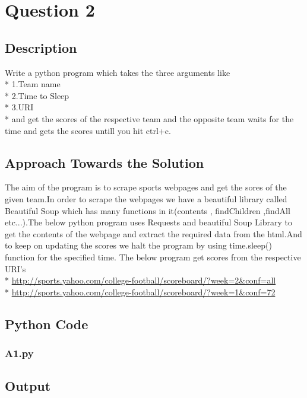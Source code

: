 \documentclass[12pt]{article}
\begin{document}
\section{Question 2}
\subsection{Description}
Write a python program which takes the three arguments like\\* 
1.Team name\\*
2.Time to Sleep\\*
3.URI\\*
and get the scores of the respective team and the opposite team waits for the time and gets the scores untill you hit ctrl+c.
\subsection{Approach Towards the Solution}
The aim of the program is to scrape sports webpages and get the sores of the given team.In order to scrape the webpages we have a beautiful library called Beautiful Soup which has many functions in it(contents , findChildren ,findAll etc...).The below python program uses Requests and beautiful Soup Library to get the contents of the webpage and extract the required data from the html.And to keep on updating the scores we halt the program by using time.sleep() function for the specified time.
 The below program get scores from the respective URI's\\*
\url{http://sports.yahoo.com/college-football/scoreboard/?week=2&conf=all}
\\*
\url {http://sports.yahoo.com/college-football/scoreboard/?week=1&conf=72}

\subsection{Python Code}
\subsubsection{A1.py}


\newpage
\subsection{Output}
\end{document}

